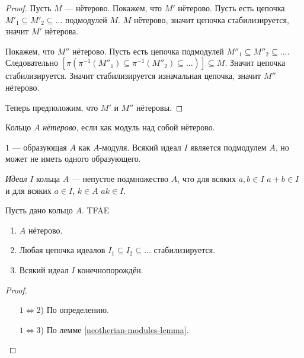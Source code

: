 \documentclass[12pt,a4paper]{article}
\begin{document}
    \begin{proof}
        Пусть $M$ --- нётерово. Покажем, что $M'$ нётерово. Пусть есть цепочка $M'_1 \subseteq M'_2 \subseteq \dots$ подмодулей $M$. $M$ нётерово, значит цепочка стабилизируется, значит $M'$ нётерова.

        Покажем, что $M''$ нётерово. Пусть есть цепочка подмодулей $M''_1 \subseteq M''_2 \subseteq \dots$. Следовательно $[\pi(\pi^{-1}(M''_1) \subseteq \pi^{-1}(M''_2) \subseteq \dots)] \subseteq M$. Значит цепочка стабилизируется. Значит стабилизируется изначальная цепочка, значит $M''$ нётерово.

        Теперь предположим, что $M'$ и $M''$ нётеровы.
    \end{proof}

    \begin{definition}
        Кольцо $A$ \emph{нётерово}, если как модуль над собой нётерово.
    \end{definition}

    \begin{remark}
        $1$ --- образующая $A$ как $A$-модуля. Всякий идеал $I$ является подмодулем $A$, но может не иметь одного образующего.
    \end{remark}

    \begin{definition}
        \emph{Идеал} $I$ кольца $A$ --- непустое подмножество $A$, что для всяких $a, b \in I$ $a + b \in I$ и для всяких $a \in I$, $k \in A$ $ak \in I$.
    \end{definition}

    \begin{lemma} \label{neotherian-rings-and-finitely-generated-ideals-lemma}
        Пусть дано кольцо $A$. TFAE
        \begin{enumerate}
            \item $A$ нётерово.
            \item Любая цепочка идеалов $I_1 \subseteq I_2 \subseteq \dots$ стабилизируется.
            \item Всякий идеал $I$ конечнопорождён.
        \end{enumerate}
    \end{lemma}

    \begin{proof}
        \begin{itemize}
            \item[$1 \Leftrightarrow 2$)] По определению.
            \item[$1 \Leftrightarrow 3$)] По лемме \ref{neotherian-modules-lemma}.  
        \end{itemize}
    \end{proof}
\end{document}
